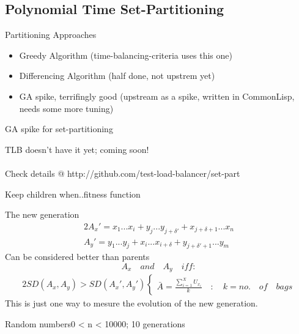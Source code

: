 \documentclass{beamer}
\begin{document}
\subsection{Polynomial Time Set-Partitioning}

\begin{frame}{Partitioning Approaches}
  \begin{itemize}
    \item Greedy Algorithm (time-balancing-criteria uses this one)
    \item Differencing Algorithm (half done, not upstrem yet)
    \item GA spike, terrifingly good (upstream as a spike, written in CommonLisp, needs some more tuning)
  \end{itemize}
\end{frame}

\begin{frame}{GA spike for set-partitioning}
  \begin{center}
    {\large TLB doesn't have it yet; coming soon! }\\
    \quad\\
    {\small Check details @ http://github.com/test-load-balancer/set-part }
  \end{center}
\end{frame}

\begin{frame}{Keep children when..}{fitness function}
  \begin{center}
    The new generation
    \begin{alignat}{2}
      A_x' =x_1...x_{i} + y_j...y_{j + \delta'} + x_{j+\delta+1}...x_n\\
      A_y' =y_1...y_{j} + x_i...x_{i + \delta} + y_{j+\delta'+1}...y_m
    \end{alignat}
    Can be considered better than parents $$A_x\quad and\quad A_y\quad iff:$$
    \begin{alignat}{2}
      SD(A_x,A_y) > SD(A_x', A_y') 
      \begin{cases}
        \bar{A} = \frac{\sum_{i=1}^XU_{x_i}}{k}\quad :\quad k = no.\quad of\quad bags
      \end{cases}
    \end{alignat}
    This is just one way to mesure the evolution of the new generation.\\
  \end{center}
\end{frame}

\begin{frame}{Random numbers}{0 < n < 10000; 10 generations}
  \begin{centering}
  \end{centering}
\end{frame}
\end{document}

